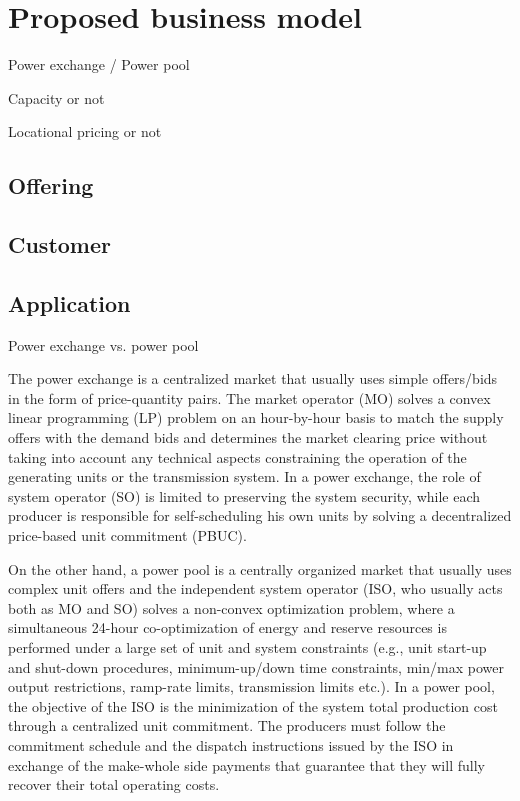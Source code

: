 \section{Proposed business model}
Power exchange / Power pool

Capacity or not

Locational pricing or not
\subsection{Offering}

\subsection{Customer}

\subsection{Application}


Power exchange vs. power pool

The power exchange is a centralized market that usually uses simple offers/bids in the form of price-quantity pairs. The market operator (MO) solves a convex linear programming (LP) problem on an hour-by-hour basis to match the supply offers with the demand bids and determines the market clearing price without taking into account any technical aspects constraining the operation of the generating units or the transmission system. In a power exchange, the role of system operator (SO) is limited to preserving the system security, while each producer is responsible for self-scheduling his own units by solving a decentralized price-based unit commitment (PBUC).

On the other hand, a power pool is a centrally organized market that usually uses complex unit offers and the independent system operator (ISO, who usually acts both as MO and SO) solves a non-convex optimization problem, where a simultaneous 24-hour co-optimization of energy and reserve resources is performed under a large set of unit and system constraints (e.g., unit start-up and shut-down procedures, minimum-up/down time constraints, min/max power output restrictions, ramp-rate limits, transmission limits etc.). In a power pool, the objective of the ISO is the minimization of the system total production cost through a centralized unit commitment. The producers must follow the commitment schedule and the dispatch instructions issued by the ISO in exchange of the make-whole side payments that guarantee that they will fully recover their total operating costs.

